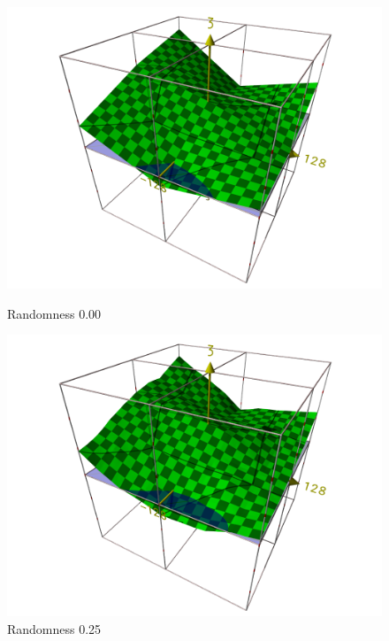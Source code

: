 \documentclass[
	12pt,
	a4paper,
	BCOR10mm,
	DIV14,
	headsepline,
]{scrreprt}
\begin{document}
\begin{figure}[H]
  \centering
  \begin{minipage}[b]{0.49\textwidth}
    \includegraphics[width=\textwidth]{000.png}
    \caption{Randomness 0.00}
	\label{000}
  \end{minipage}
  \hfill
  \begin{minipage}[b]{0.49\textwidth}
    \includegraphics[width=\textwidth]{025.png}
    \caption{Randomness 0.25}
	\label{025}
  \end{minipage}
\end{figure}
\end{document}
